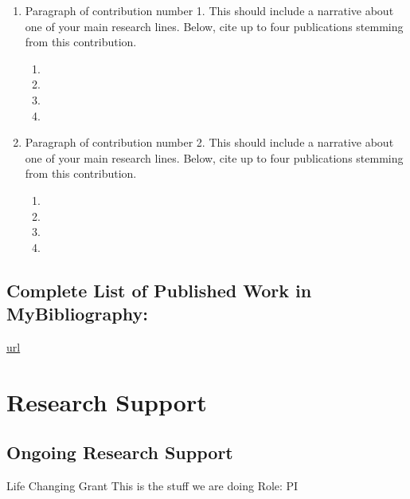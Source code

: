 \documentclass{nihbiosketch}
\providecommand{\tightlist}{\setlength{\itemsep}{0pt}\setlength{\parskip}{0pt}}
\begin{document}
\begin{enumerate}
\def\labelenumi{\arabic{enumi}.}
\tightlist
\item
  Paragraph of contribution number 1. This should include a narrative
  about one of your main research lines. Below, cite up to four
  publications stemming from this contribution.

  \begin{enumerate}
  \def\labelenumii{\arabic{enumii}.}
  \item
  \item
  \item
  \item
  \end{enumerate}
\item
  Paragraph of contribution number 2. This should include a narrative
  about one of your main research lines. Below, cite up to four
  publications stemming from this contribution.

  \begin{enumerate}
  \def\labelenumii{\arabic{enumii}.}
  \item
  \item
  \item
  \item
  \end{enumerate}
\end{enumerate}



  \subsection*{Complete List of Published Work in MyBibliography:} 
  \url{url}

  \section{Research Support}
  
        \subsection*{Ongoing Research Support}
    
            
      {Life Changing Grant}
      {This is the stuff we are doing}
      {Role: PI}
      
\end{document}
